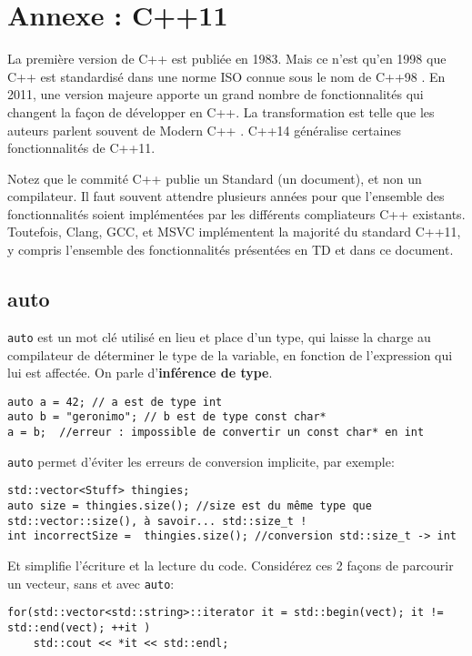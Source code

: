\documentclass[9pt]{article}
\begin{document}
\newpage

\section*{Annexe : C++11}

La première version de C++ est publiée en 1983. Mais ce n'est qu'en 1998 que C++ est standardisé dans une norme ISO connue sous le nom de \og C++98 \fg{}. En 2011, une version majeure apporte un grand nombre de fonctionnalités qui changent la façon de développer en C++.
La transformation est telle que les auteurs parlent souvent de \og Modern C++ \fg{}.
C++14 généralise certaines fonctionnalités de C++11.

Notez que le commité C++ publie un \og Standard \fg{} (un document), et non un compilateur. Il faut souvent attendre plusieurs années pour que l'ensemble des fonctionnalités soient implémentées par les différents compliateurs C++ existants. Toutefois, Clang, GCC, et MSVC implémentent la majorité du standard C++11, y compris l'ensemble des fonctionnalités présentées en TD et dans ce document.


\subsection*{auto}

\lstinline{auto} est un mot clé utilisé en lieu et place d'un type, qui laisse la charge au compilateur de déterminer le type de la variable, en fonction de l'expression qui lui est affectée. On parle d'\textbf{inférence de type}.

\begin{lstlisting}
auto a = 42; // a est de type int
auto b = "geronimo"; // b est de type const char*
a = b;  //erreur : impossible de convertir un const char* en int
\end{lstlisting}

\lstinline{auto} permet d'éviter les erreurs de conversion implicite, par exemple:
\begin{lstlisting}
std::vector<Stuff> thingies;
auto size = thingies.size(); //size est du même type que std::vector::size(), à savoir... std::size_t !
int incorrectSize =  thingies.size(); //conversion std::size_t -> int
\end{lstlisting}

Et simplifie l'écriture et la lecture du code. Considérez ces 2 façons de parcourir un vecteur, sans et avec \lstinline{auto}:

\begin{lstlisting}
for(std::vector<std::string>::iterator it = std::begin(vect); it != std::end(vect); ++it )
	std::cout << *it << std::endl;
\end{lstlisting}
\end{document}
